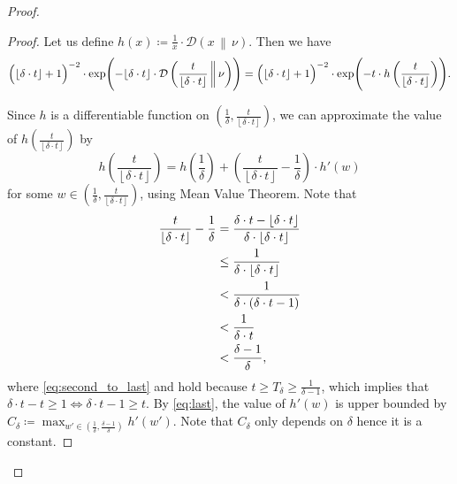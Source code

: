 \documentclass[letterpaper,11pt]{article}
\newenvironment{claimproof}{\begin{proof}\renewcommand{\qedsymbol}{$\lrcorner$}}{\end{proof}}
\newcommand{\floor}[1]{ {\left\lfloor #1 \right\rfloor}}
\newcommand{\1}[1]{\mathds{1}\left[#1\right]}
\newcommand{\D}[2]{\mathcal{D}\left(#1\, \middle\|\,#2 \right)}
\begin{document}
\begin{proof}
		\begin{claimproof}
			Let us define $h(x) \coloneqq \frac{1}{x} \cdot \D{x}{\nu}$. Then we have
			\begin{equation*}
			\Bigl( \floor{\delta\cdot t} + 1 \Bigr)^{-2} \cdot \exp\Biggl( - \floor{\delta \cdot t} \cdot \D{\frac{t}{\floor{\delta \cdot t}}}{\nu}\Biggr) = \Bigl( \floor{\delta\cdot t} + 1 \Bigr)^{-2} \cdot \exp \Biggl( -t \cdot h\left( \frac{t}{\floor{\delta \cdot t}} \right)  \Biggr).
			\end{equation*}
	
			Since $h$ is a differentiable function on $\left( \frac{1}{\delta}, \frac{t}{\floor{\delta \cdot t}} \right)$, we can approximate the value of $h\left( \frac{t}{\floor{\delta \cdot t}} \right)$ by
			\begin{equation}\label{eq:h_taylor}
				h\left( \frac{t}{\floor{\delta \cdot t}} \right) = h\left( \frac{1}{\delta} \right) + \left( \frac{t}{\floor{\delta \cdot t}} - \frac{1}{\delta} \right) \cdot h'(w)
			\end{equation}
			for some $w \in \left( \frac{1}{\delta}, \frac{t}{\floor{\delta \cdot t}} \right) $, using Mean Value Theorem. 
			Note that
			\begin{align}
				\frac{t}{\floor{\delta \cdot t}} - \frac{1}{\delta} &= \frac{\delta \cdot t - \floor{\delta \cdot t}}{\delta \cdot \floor{\delta \cdot t}} \notag \\
										    &\leq \frac{1}{\delta \cdot \floor{\delta \cdot t}} \notag \\
										    &< \frac{1}{\delta \cdot \left( \delta \cdot t - 1 \right) } \notag \\
										    &< \frac{1}{\delta \cdot t} \label{eq:second_to_last}\\
										    &< \frac{\delta - 1}{\delta} \label{eq:last},
			\end{align}
			where \eqref{eq:second_to_last} and hold because $t \geq T_\delta \geq \frac{1}{\delta - 1}$, which implies that $\delta \cdot t - t \geq 1 \iff \delta \cdot t - 1 \geq t$.
			By \eqref{eq:last}, the value of $h'(w)$ is upper bounded by $C_\delta \coloneqq \max_{w'\in \left(\frac{1}{\delta}, \frac{\delta-1}{\delta} \right)}  h'(w')$. Note that $C_\delta$ only depends on $\delta$ hence it is a constant.


\end{claimproof}
\end{proof}
\end{document}
